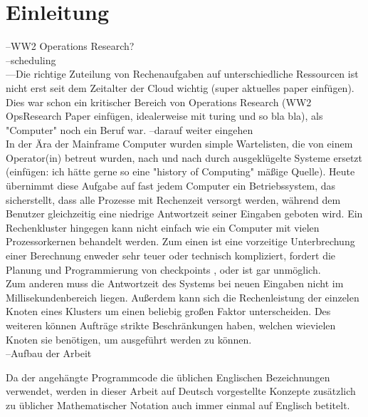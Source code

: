 \chapter{Einleitung}
\label{chap:ein}


--WW2 Operations Research?\\
--scheduling\\
---Die richtige Zuteilung von Rechenaufgaben auf unterschiedliche Ressourcen ist nicht erst seit dem Zeitalter der Cloud wichtig (super aktuelles paper einfügen). Dies war schon ein kritischer Bereich von Operations Research (WW2 OpsResearch Paper einfügen, idealerweise mit turing und so bla bla), als "Computer" noch ein Beruf war.
--darauf weiter eingehen\\

In der Ära der Mainframe Computer wurden simple Wartelisten, die von einem Operator(in) betreut wurden, nach und nach durch ausgeklügelte Systeme ersetzt (einfügen: ich hätte gerne so eine "history of Computing" mäßige Quelle). Heute übernimmt diese Aufgabe auf fast jedem Computer ein Betriebssystem, das sicherstellt, dass alle Prozesse mit Rechenzeit versorgt werden, während dem Benutzer gleichzeitig eine niedrige Antwortzeit seiner Eingaben geboten wird. Ein Rechenkluster hingegen kann nicht einfach wie ein Computer mit vielen Prozessorkernen behandelt werden. Zum einen ist eine vorzeitige Unterbrechung einer Berechnung enweder sehr teuer oder technisch kompliziert, fordert die Planung und Programmierung von checkpoints \cite{IPS15}, oder ist gar unmöglich.\\
Zum anderen muss die Antwortzeit des Systems bei neuen Eingaben nicht im Millisekundenbereich liegen. Außerdem kann sich die Rechenleistung der einzelen Knoten eines Klusters um einen beliebig großen Faktor unterscheiden.  Des weiteren können Aufträge strikte Beschränkungen haben, welchen wievielen Knoten sie benötigen, um ausgeführt werden zu können.\\



--Aufbau der Arbeit


Da der angehängte Programmcode die üblichen Englischen Bezeichnungen verwendet, werden in dieser Arbeit auf Deutsch vorgestellte Konzepte zusätzlich zu üblicher Mathematischer Notation auch immer einmal auf Englisch betitelt.


